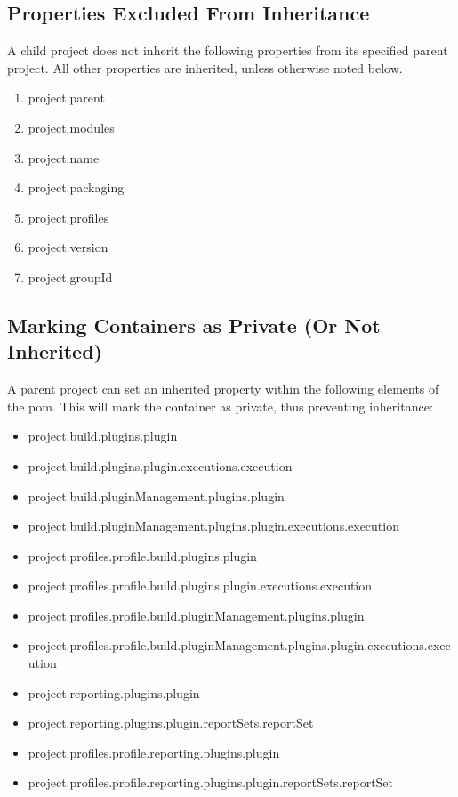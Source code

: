 \documentclass[12pt]{amsart}
\begin{document}
\subsection{Properties Excluded From Inheritance}
A child project does not inherit the following properties from its specified parent project. All other properties are inherited, unless otherwise noted below.
\begin{enumerate}
\item project.parent
\item project.modules
\item project.name
\item project.packaging
\item project.profiles
\item project.version
\item project.groupId
\end{enumerate}

\subsection{Marking Containers as Private (Or Not Inherited)}
A parent project can set an inherited property within the following elements of the pom. This will mark the container as private, thus preventing inheritance:
\begin{itemize}
\item project.build.plugins.plugin
\item project.build.plugins.plugin.executions.execution
\item project.build.pluginManagement.plugins.plugin
\item project.build.pluginManagement.plugins.plugin.executions.execution
\item project.profiles.profile.build.plugins.plugin
\item project.profiles.profile.build.plugins.plugin.executions.execution
\item project.profiles.profile.build.pluginManagement.plugins.plugin
\item project.profiles.profile.build.pluginManagement.plugins.plugin.executions.execution
\item project.reporting.plugins.plugin
\item project.reporting.plugins.plugin.reportSets.reportSet
\item project.profiles.profile.reporting.plugins.plugin
\item project.profiles.profile.reporting.plugins.plugin.reportSets.reportSet
\end{itemize}
\end{document}
